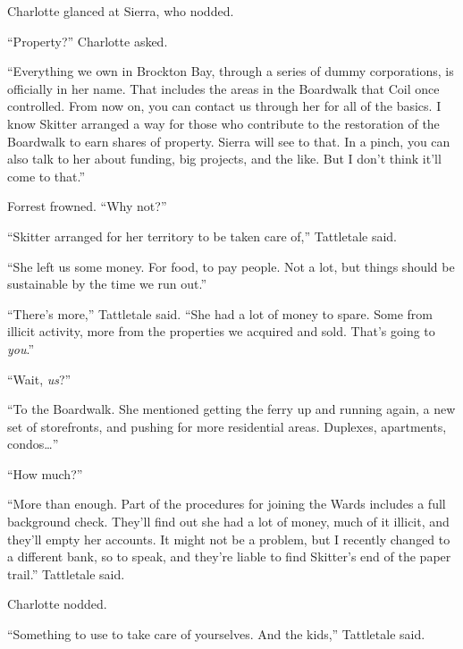 Charlotte glanced at Sierra, who nodded.



``Property?'' Charlotte asked.



``Everything we own in Brockton Bay, through a series of dummy corporations, is officially in her name.  That includes the areas in the Boardwalk that Coil once controlled.  From now on, you can contact us through her for all of the basics.  I know Skitter arranged a way for those who contribute to the restoration of the Boardwalk to earn shares of property.  Sierra will see to that.  In a pinch, you can also talk to her about funding, big projects, and the like.  But I don't think it'll come to that.''



Forrest frowned.  ``Why not?''



``Skitter arranged for her territory to be taken care of,'' Tattletale said.



``She left us some money.  For food, to pay people.  Not a lot, but things should be sustainable by the time we run out.''



``There's more,'' Tattletale said.  ``She had a lot of money to spare.  Some from illicit activity, more from the properties we acquired and sold.  That's going to \emph{you}.''



``Wait, \emph{us}?''



``To the Boardwalk.  She mentioned getting the ferry up and running again, a new set of storefronts, and pushing for more residential areas.  Duplexes, apartments, condos\ldots''



``How much?''



``More than enough.  Part of the procedures for joining the Wards includes a full background check.  They'll find out she had a lot of money, much of it illicit, and they'll empty her accounts.  It might not be a problem, but I recently changed to a different bank, so to speak, and they're liable to find Skitter's end of the paper trail.'' Tattletale said.



Charlotte nodded.



``Something to use to take care of yourselves.  And the kids,'' Tattletale said.



